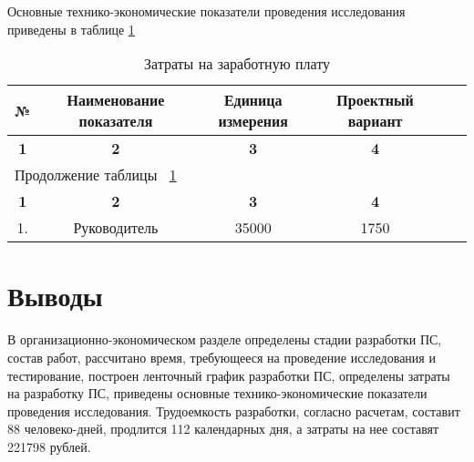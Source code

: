 Основные технико-экономические показатели проведения исследования приведены в таблице \ref{tab:eco_osn_tepp} 

\begin{center}
\begin{longtable}{|c|c|c|c|c|c|}
\caption{Затраты на заработную плату} \label{tab:eco_osn_tepp} \\ \hline
\multicolumn{1}{|c|}{\textbf{№}} & \multicolumn{1}{c|}{\textbf{Наименование показателя}} & 
\multicolumn{1}{p{3cm}|}{\textbf{Единица измерения}} &   \multicolumn{1}{c|}{\textbf{Проектный вариант}} \\ \hline 

\multicolumn{1}{|c|}{\textbf{1}} &   \multicolumn{1}{c|}{\textbf{2}} & 
\multicolumn{1}{c|}{\textbf{3}} & \multicolumn{1}{c|}{\textbf{4}} \\ \hline
\endfirsthead

\multicolumn{4}{|l|}{{Продолжение таблицы ~\ref{tab:eco_osn_tepp}}} \\ %
\hline
\multicolumn{1}{|c|}{\textbf{1}} &   \multicolumn{1}{c|}{\textbf{2}} & 
\multicolumn{1}{c|}{\textbf{3}} & \multicolumn{1}{c|}{\textbf{4}} \\ \hline
\endhead

\endfoot

\hline
\endlastfoot

1. & Руководитель & 35000 & 1750  \\ \hline

\hline

\end{longtable}
\end{center}

\newpage
\section{Выводы}
В организационно-экономическом разделе определены стадии разработки ПС, состав работ, рассчитано время, требующееся на
проведение исследования и тестирование, построен ленточный график разработки ПС, определены затраты на разработку ПС,
приведены основные технико-экономические показатели проведения исследования.
Трудоемкость разработки, согласно расчетам, составит 88 человеко-дней, продлится 112 календарных дня, а затраты на
нее составят 221798 рублей.

\newpage
